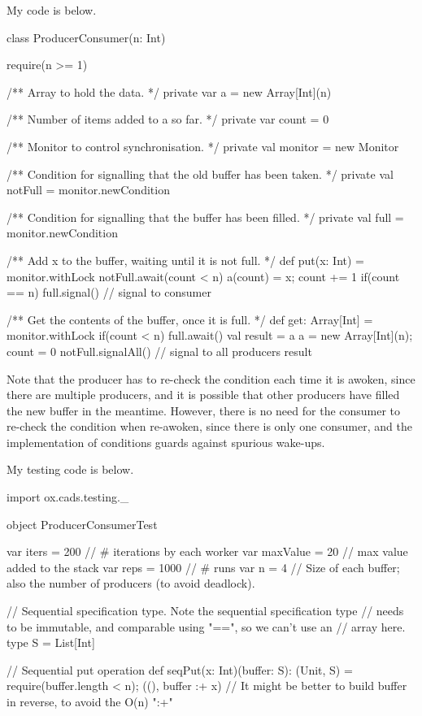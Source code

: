 \begin{answer}
My code is below.
%
\begin{scala}
class ProducerConsumer(n: Int){
  require(n >= 1)

  /** Array to hold the data. */
  private var a = new Array[Int](n)

  /** Number of items added to a so far. */
  private var count = 0

  /** Monitor to control synchronisation. */
  private val monitor = new Monitor

  /** Condition for signalling that the old buffer has been taken. */
  private val notFull = monitor.newCondition

  /** Condition for signalling that the buffer has been filled. */
  private val full = monitor.newCondition

  /** Add x to the buffer, waiting until it is not full. */
  def put(x: Int) = monitor.withLock{
    notFull.await(count < n)
    a(count) = x; count += 1
    if(count == n) full.signal() // signal to consumer
  }

  /** Get the contents of the buffer, once it is full. */
  def get: Array[Int] = monitor.withLock{
    if(count < n) full.await()
    val result = a
    a = new Array[Int](n); count = 0
    notFull.signalAll() // signal to all producers 
    result    
  }
}
\end{scala}
%
Note that the producer has to re-check the condition each time it is awoken,
since there are multiple producers, and it is possible that other producers
have filled the new buffer in the meantime.  However, there is no need for the
consumer to re-check the condition when re-awoken, since there is only one
consumer, and the implementation of conditions guards against spurious
wake-ups. 

My testing code is below.
%
\begin{scala}
import ox.cads.testing._

object ProducerConsumerTest{
  var iters = 200 // # iterations by each worker
  var maxValue = 20  // max value added to the stack
  var reps = 1000 // # runs
  var n = 4  // Size of each buffer; also the number of producers (to avoid deadlock).

  // Sequential specification type.  Note the sequential specification type
  // needs to be immutable, and comparable using "==", so we can't use an 
  // array here.
  type S = List[Int]

  // Sequential put operation
  def seqPut(x: Int)(buffer: S): (Unit, S) = {
    require(buffer.length < n); ((), buffer :+ x)
  }
  // It might be better to build buffer in reverse, to avoid the O(n) ":+"

}
\end{scala}
\end{answer}
